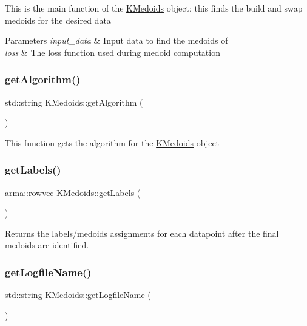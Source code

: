 This is the main function of the \hyperlink{classKMedoids}{K\+Medoids} object\+: this finds the build and swap medoids for the desired data


\begin{DoxyParams}{Parameters}
{\em input\+\_\+data} & Input data to find the medoids of \\
\hline
{\em loss} & The loss function used during medoid computation \\
\hline
\end{DoxyParams}
\mbox{\label{classKMedoids_a01a1bf63fdd2cd8b389c3f1c0619388f}} 
\subsubsection{\texorpdfstring{get\+Algorithm()}{getAlgorithm()}}
{\footnotesize\ttfamily std\+::string K\+Medoids\+::get\+Algorithm (\begin{DoxyParamCaption}{ }\end{DoxyParamCaption})}

This function gets the algorithm for the \hyperlink{classKMedoids}{K\+Medoids} object \mbox{\label{classKMedoids_a89474787892880381e4d0282de541d03}} 
\subsubsection{\texorpdfstring{get\+Labels()}{getLabels()}}
{\footnotesize\ttfamily arma\+::rowvec K\+Medoids\+::get\+Labels (\begin{DoxyParamCaption}{ }\end{DoxyParamCaption})}

Returns the labels/medoids assignments for each datapoint after the final medoids are identified. \mbox{\label{classKMedoids_ad5982ef2a71cce9f1f45b98c55350391}} 
\subsubsection{\texorpdfstring{get\+Logfile\+Name()}{getLogfileName()}}
{\footnotesize\ttfamily std\+::string K\+Medoids\+::get\+Logfile\+Name (\begin{DoxyParamCaption}{ }\end{DoxyParamCaption})}

